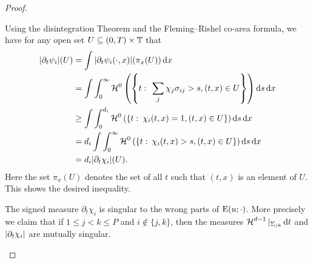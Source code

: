 \begin{proof}
\begin{description}[wide=0pt]
		Using the disintegration Theorem 
		\cite[Thm.~3.103]{ambrosio_fusco_pallara_functions_of_bv_and_free_discontinuity_problems}
		 and the Fleming--Rishel co-area formula, we have for any open set 
		$ U \subseteq ( 0 , T ) \times \operatorname{\mathbb{T}} $ that
		\begin{align*}
			\abs{
				\partial_{ t } \psi_{ i }
			} ( U ) 
			& =
			\int
			\abs{ 
				\partial_{ t } \psi_{ i } ( \cdot , x )
			} ( \pi_{ x } ( U ) ) 
			\dd{ x }
			\\
			& =
			\int
			\int_{ 0 }^{ \infty }
			\operatorname{\mathcal{H}}^{ 0 } \left(
			\left\{
			t 
			\, \colon \,
			\sum_{ j } \chi_{ j } \sigma_{ i j } > s,
			( t, x ) \in U
			\right\}
			\right)
			\dd{ s }
			\dd{ x }
			\\
			& \geq
			\int
			\int_{ 0 }^{ d_{ i } }
			\operatorname{\mathcal{H}}^{ 0 }
			\left(
			\left\{
			t 
			\, \colon \,
			\chi_{ i } ( t , x ) = 1,
			( t, x ) \in U
			\right\}
			\right)
			\dd{ s }
			\dd{ x }
			\\
			& =
			d_{ i }
			\int
			\int_{ 0 }^{ \infty }
			\operatorname{\mathcal{H}}^{ 0 } \left(
			\left\{
			t 
			\, \colon \,
			\chi_{ i } ( t , x ) > s , ( t , x ) \in U
			\right\}
			\right)
			\dd{ s }
			\dd{ x }
			\\
			& =
			d_{ i }
			\abs{ \partial_{ t } \chi_{ i } } ( U ).
		\end{align*}
		Here the set $ \pi_{ x } ( U ) $ denotes the set of all $ t $ such that 
		$ ( t , x ) $ is an element of $ U $. This shows the desired inequality.
		
		\item[Step 3:] The signed measure $ \partial_{ t } \chi_{ i } $ is 
		singular to the wrong parts of $ \operatorname{E} ( u ; \cdot ) $. More 
		precisely we claim that if $ 1 \leq j < k \leq P $ and $ i \notin \{ j 
		, k \} $, then the measures 
		$ \operatorname{\mathcal{H}}^{ d - 1 } |_{ \Sigma_{ j k } } \dd{ t } $ and $ \abs{ \partial_{ 
				t } \chi_{ i } } $ are mutually singular.
		

\end{description}
\end{proof}
